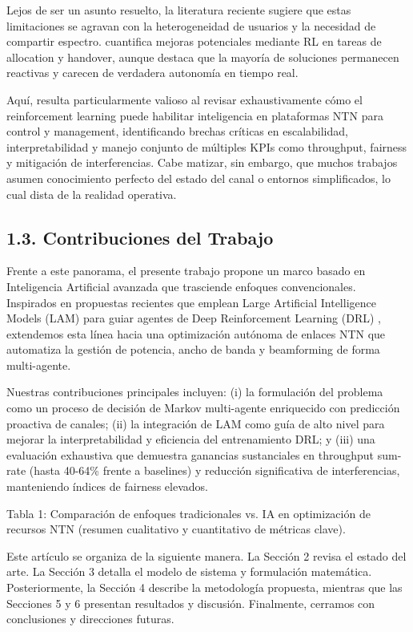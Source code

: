 Lejos de ser un asunto resuelto, la literatura reciente sugiere que estas limitaciones se agravan con la heterogeneidad de usuarios y la necesidad de compartir espectro. \cite{Giuliano2023} cuantifica mejoras potenciales mediante RL en tareas de allocation y handover, aunque destaca que la mayoría de soluciones permanecen reactivas y carecen de verdadera autonomía en tiempo real. 

Aquí, \cite{Naous2023} resulta particularmente valioso al revisar exhaustivamente cómo el reinforcement learning puede habilitar inteligencia en plataformas NTN para control y management, identificando brechas críticas en escalabilidad, interpretabilidad y manejo conjunto de múltiples KPIs como throughput, fairness y mitigación de interferencias. Cabe matizar, sin embargo, que muchos trabajos asumen conocimiento perfecto del estado del canal o entornos simplificados, lo cual dista de la realidad operativa.

\subsection{1.3. Contribuciones del Trabajo}

Frente a este panorama, el presente trabajo propone un marco basado en Inteligencia Artificial avanzada que trasciende enfoques convencionales. Inspirados en propuestas recientes que emplean Large Artificial Intelligence Models (LAM) para guiar agentes de Deep Reinforcement Learning (DRL) \cite{Ibrahim2026}, extendemos esta línea hacia una optimización autónoma de enlaces NTN que automatiza la gestión de potencia, ancho de banda y beamforming de forma multi-agente.

Nuestras contribuciones principales incluyen: (i) la formulación del problema como un proceso de decisión de Markov multi-agente enriquecido con predicción proactiva de canales; (ii) la integración de LAM como guía de alto nivel para mejorar la interpretabilidad y eficiencia del entrenamiento DRL; y (iii) una evaluación exhaustiva que demuestra ganancias sustanciales en throughput sum-rate (hasta 40-64\% frente a baselines) y reducción significativa de interferencias, manteniendo índices de fairness elevados.

Tabla 1: Comparación de enfoques tradicionales vs. IA en optimización de recursos NTN (resumen cualitativo y cuantitativo de métricas clave).

Este artículo se organiza de la siguiente manera. La Sección 2 revisa el estado del arte. La Sección 3 detalla el modelo de sistema y formulación matemática. Posteriormente, la Sección 4 describe la metodología propuesta, mientras que las Secciones 5 y 6 presentan resultados y discusión. Finalmente, cerramos con conclusiones y direcciones futuras.